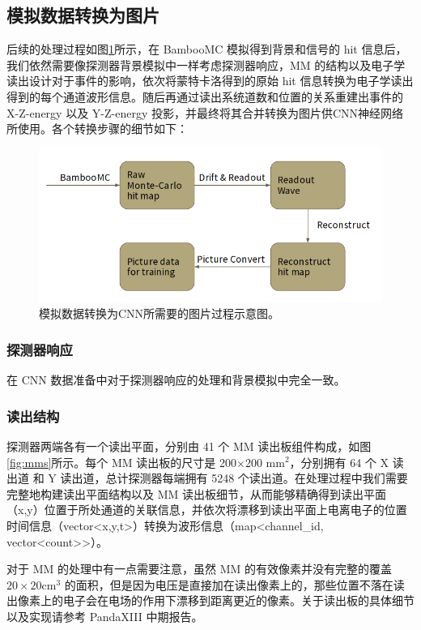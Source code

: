 \subsection{模拟数据转换为图片}

后续的处理过程如图\ref{fig:process}所示，在 BambooMC 模拟得到背景和信号的 hit 信息后，我们依然需要像探测器背景模拟中一样考虑探测器响应，MM 的结构以及电子学读出设计对于事件的影响，依次将蒙特卡洛得到的原始 hit 信息转换为电子学读出得到的每个通道波形信息。随后再通过读出系统道数和位置的关系重建出事件的 X-Z-energy 以及 Y-Z-energy 投影，并最终将其合并转换为图片供CNN神经网络所使用。各个转换步骤的细节如下：

\begin{figure}
    \centering
    \includegraphics[width=0.6\columnwidth]{pic/process.png}
    \caption{模拟数据转换为CNN所需要的图片过程示意图。}
    \label{fig:process}
\end{figure}

\subsubsection{探测器响应}

    在 CNN 数据准备中对于探测器响应的处理和背景模拟中完全一致。

\subsubsection{读出结构}

    探测器两端各有一个读出平面，分别由 41 个 MM 读出板组件构成，如图\ref{fig:mms}所示。每个 MM 读出板的尺寸是 200$\times$200 mm$^2$，分别拥有 64 个 X 读出道 和 Y 读出道，总计探测器每端拥有 5248 个读出道。在处理过程中我们需要完整地构建读出平面结构以及 MM 读出板细节，从而能够精确得到读出平面（x,y）位置于所处通道的关联信息，并依次将漂移到读出平面上电离电子的位置时间信息（vector<x,y,t>）转换为波形信息（map<channel\_id, vector<count>>）。

    对于 MM 的处理中有一点需要注意，虽然 MM 的有效像素并没有完整的覆盖 $20\times20$cm$^3$ 的面积，但是因为电压是直接加在读出像素上的，那些位置不落在读出像素上的电子会在电场的作用下漂移到距离更近的像素。关于读出板的具体细节以及实现请参考 PandaXIII 中期报告\supercite{cdr}。


